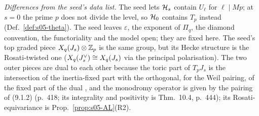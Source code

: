 \noindent\emph{Differences from the seed's data list.} The seed lets $\mathcal{H}_s$ contain $U_\ell$ for $\ell\mid Mp$; at $s=0$ the prime $p$ does
not divide the level, so $\mathcal{H}_0$ contains $T_p$ instead (Def.~\ref{def:s05-theta}). The seed leaves $\varepsilon$, the exponent of $\Pi_q$,
the diamond convention, the functoriality and the model open; they are fixed here. The seed's top graded piece $X_q(J_s)\otimes\mathbb{Z}_p$ is the
same group, but its Hecke structure is the Rosati-twisted one ($X_q(J_s^\vee)\cong X_q(J_s)$ via the principal polarisation). The two outer
pieces are dual to each other because the toric part of $T_pJ_s$ is the intersection of the inertia-fixed part with the orthogonal, for the
Weil pairing, of the fixed part of the dual
,
and the monodromy operator is given by the pairing of (9.1.2) (p.~418; its integrality and positivity is Thm.~10.4, p.~444); its Rosati-equivariance
is Prop.~\ref{prop:s05-AL}(R2).

